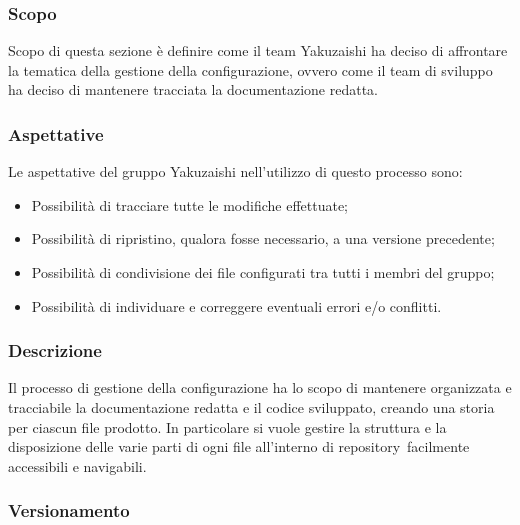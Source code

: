     \subsubsection{Scopo}
    Scopo di questa sezione è definire come il team Yakuzaishi ha deciso di affrontare la tematica della gestione della configurazione, ovvero come il team di sviluppo ha deciso di mantenere tracciata la documentazione redatta.

    \subsubsection{Aspettative}
    Le aspettative del gruppo Yakuzaishi nell'utilizzo di questo processo sono:
    \begin{itemize}
        \item Possibilità di tracciare tutte le modifiche effettuate;
        \item Possibilità di ripristino, qualora fosse necessario, a una versione precedente;
        \item Possibilità di condivisione dei file configurati tra tutti i membri del gruppo;
        \item Possibilità di individuare e correggere eventuali errori e/o conflitti.
    \end{itemize}

    \subsubsection{Descrizione}
    Il processo di gestione della configurazione ha lo scopo di mantenere organizzata e tracciabile la documentazione redatta e il codice sviluppato, creando una storia per ciascun file prodotto.
    In particolare si vuole gestire la struttura e la disposizione delle varie parti di ogni file all'interno di repository\glo\ facilmente accessibili e navigabili.

    \subsubsection{Versionamento}
